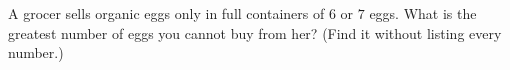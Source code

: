 A grocer sells organic eggs only in full containers of $6$ or $7$ eggs. What is the greatest number of eggs you cannot buy from her? (Find it without listing every number.)

